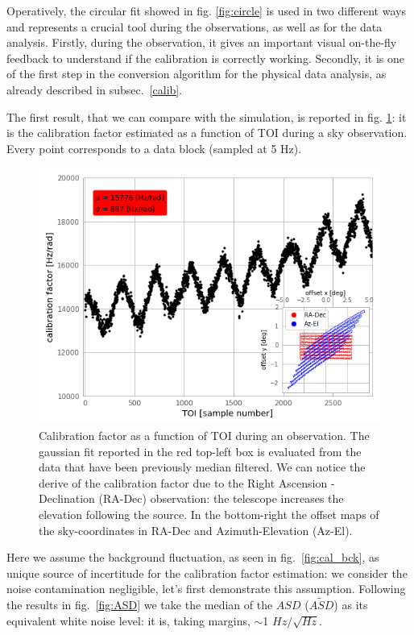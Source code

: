 \documentclass[twocolumn,traditabstract]{aa}\\
\begin{document}
\noindent Operatively, the circular fit showed in fig. \ref{fig:circle} is used in two different ways and represents a crucial tool during the observations, as well as for the data analysis. Firstly, during the observation, it gives an important visual on-the-fly feedback to understand if the calibration is correctly working. Secondly, it is one of the first step in the conversion algorithm for the physical data analysis, as already described in subsec.~\ref{calib}.

The first result, that we can compare with the simulation, is reported in fig. \ref{fig:calfact}: it is the calibration factor estimated as a function of TOI during a sky observation. Every point corresponds to a data block (sampled at 5 Hz).

\begin{figure}[htf]
	\centering
	\includegraphics[width=.5\textwidth]{4.results/calfact.png}
	\caption{Calibration factor as a function of TOI during an observation. The gaussian fit reported in the red top-left box is evaluated from the data that have been previously median filtered. We can notice the derive of the calibration factor due to the Right Ascension - Declination (RA-Dec) observation: the telescope increases the elevation following the source. In the bottom-right the offset maps of the sky-coordinates in RA-Dec and Azimuth-Elevation (Az-El).}
	\label{fig:calfact}
\end{figure}


Here we assume the background fluctuation, as seen in fig.~\ref{fig:cal_bck}, as unique source of incertitude for the calibration factor estimation: we consider the noise contamination negligible, let's first demonstrate this assumption. Following the results in fig.~\ref{fig:ASD} we take the median of the $ASD$ ($\tilde{ASD}$) as its equivalent white noise level: it is, taking margins, $\sim$1 $Hz/\sqrt{Hz}$.
\end{document}
